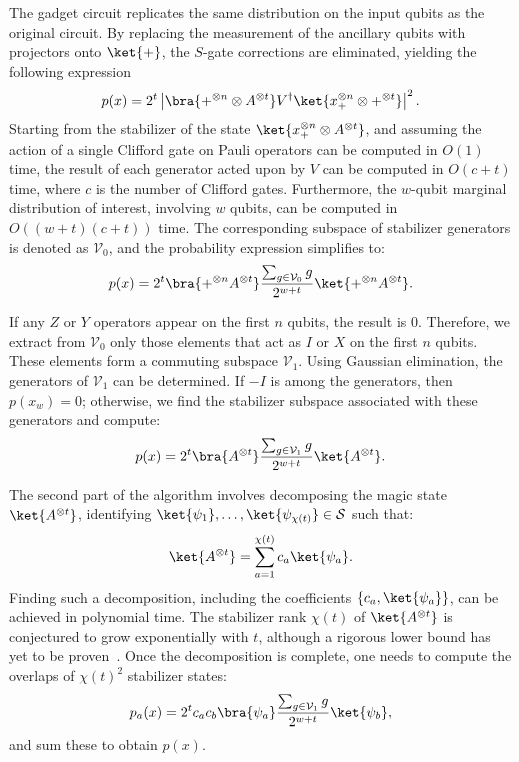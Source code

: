 \documentclass[aps,%
twocolumn,%
floatfix,%
pra,%
amsfonts,%
longbibliography,%
groupedaddress,%
superscriptaddress]{revtex4-2}%
\newcommand{\1}{\mathbbm{1}}
\begin{document}
The gadget circuit replicates the same distribution on the input qubits as the original circuit. By replacing the measurement of the ancillary qubits with projectors onto \(\ket{+}\), the \( S \)-gate corrections are eliminated, yielding the following expression
\begin{align}
    p(x) = 2^t \left|\bra{+^{\otimes n} \otimes A^{\otimes t}} V^\dagger \ket{x_+^{\otimes n} \otimes +^{\otimes t}}\right|^2.
\end{align}
Starting from the stabilizer of the state \(\ket{x_+^{\otimes n} \otimes A^{\otimes t}}\), and assuming the action of a single Clifford gate on Pauli operators can be computed in \( O(1) \) time, the result of each generator acted upon by \( V \) can be computed in \( O(c + t) \) time, where \( c \) is the number of Clifford gates. Furthermore, the \( w \)-qubit marginal distribution of interest, involving \( w \) qubits, can be computed in \( O((w + t)(c + t)) \) time. The corresponding subspace of stabilizer generators is denoted as \(\mathcal{V}_0\), and the probability expression simplifies to:
\[
p(x) = 2^t \bra{+^{\otimes n}  A^{\otimes t}} \frac{\sum_{g \in \mathcal{V}_0} g}{2^{w + t}} \ket{+^{\otimes n}  A^{\otimes t}}.
\]

If any \( Z \) or \( Y \) operators appear on the first \( n \) qubits, the result is \( 0 \). Therefore, we extract from \(\mathcal{V}_0\) only those elements that act as \( I \) or \( X \) on the first \( n \) qubits. These elements form a commuting subspace \(\mathcal{V}_1\). Using Gaussian elimination, the generators of \(\mathcal{V}_1\) can be determined. If \(-I\) is among the generators, then \( p(x_w) = 0 \); otherwise, we find the stabilizer subspace associated with these generators and compute:
\[
p(x) = 2^t \bra{A^{\otimes t}} \frac{\sum_{g \in \mathcal{V}_1} g}{2^{w + t}} \ket{A^{\otimes t}}.
\]

The second part of the algorithm involves decomposing the magic state \(\ket{A^{\otimes t}}\), identifying \(\ket{\psi_1}, \ldots, \ket{\psi_{\chi(t)}} \in \mathcal{S}\) such that:
\[
\ket{A^{\otimes t}} = \sum_{a=1}^{\chi(t)} c_a \ket{\psi_a}.
\]
Finding such a decomposition, including the coefficients \(\{c_a, \ket{\psi_a}\}\), can be achieved in polynomial time. The stabilizer rank \(\chi(t)\) of \(\ket{A^{\otimes t}}\) is conjectured to grow exponentially with \( t \), although a rigorous lower bound has yet to be proven~\cite{mehraban2024quadratic}. Once the decomposition is complete, one needs to compute the overlaps of \(\chi(t)^2\) stabilizer states:
\[
p_a(x) = 2^t c_a c_b \bra{\psi_a} \frac{\sum_{g \in \mathcal{V}_1} g}{2^{w + t}} \ket{\psi_b},
\]
and sum these to obtain \( p(x) \). 
\end{document}
